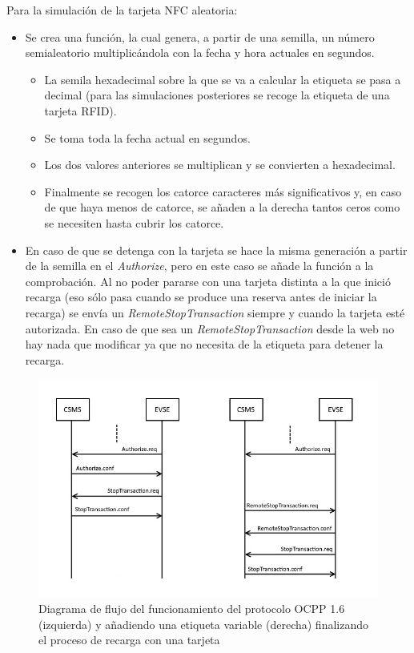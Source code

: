 \documentclass[12pt,a4paper,onecolumn,oneside]{report}
\begin{document}
Para la simulación de la tarjeta NFC aleatoria:
\begin{itemize}
\item Se crea una función, la cual genera, a partir de una semilla, un número semialeatorio multiplicándola con la fecha y hora actuales en segundos.
\begin{itemize}
\item La semila hexadecimal sobre la que se va a calcular la etiqueta se pasa a decimal (para las simulaciones posteriores se recoge la etiqueta de una tarjeta RFID).
\item Se toma toda la fecha actual en segundos.
\item Los dos valores anteriores se multiplican y se convierten a hexadecimal.
\item Finalmente se recogen los catorce caracteres más significativos y, en caso de que haya menos de catorce, se añaden a la derecha tantos ceros como se necesiten hasta cubrir los catorce.
\end{itemize}
\item En caso de que se detenga con la tarjeta se hace la misma generación a partir de la semilla en el \textit{Authorize}, pero en este caso se añade la función a la comprobación. Al no poder pararse con una tarjeta distinta a la que inició recarga (eso sólo pasa cuando se produce una reserva antes de iniciar la recarga) se envía un \textit{RemoteStopTransaction} siempre y cuando la tarjeta esté autorizada. En caso de que sea un \textit{RemoteStopTransaction} desde la web no hay nada que modificar ya que no necesita de la etiqueta para detener la recarga.
\end{itemize}
\begin{figure}[H] 
\centering
  \includegraphics[width=1\textwidth]{figuras/diagramaNFCvariable.png}
  \caption[Diagrama de flujo del funcionamiento del protocolo OCPP 1.6 (izquierda) y añadiendo una etiqueta variable (derecha) finalizando el proceso de recarga con una tarjeta]{Diagrama de flujo del funcionamiento del protocolo OCPP 1.6 (izquierda) y añadiendo una etiqueta variable (derecha) finalizando el proceso de recarga con una tarjeta\\
  }
  \label{fig:diagramanfc}
\end{figure}
\end{document}
